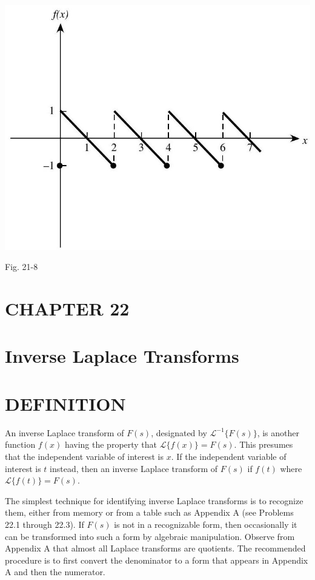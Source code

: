 \documentclass[10pt]{article}
\begin{document}
\begin{center}
\includegraphics[max width=\textwidth]{2024_04_03_5bb5b4275a64cb9887d1g-241(1)}
\end{center}

Fig. 21-8

\section*{CHAPTER 22}
\section*{Inverse Laplace Transforms}
\section*{DEFINITION}
An inverse Laplace transform of $F(s)$, designated by $\mathscr{L}^{-1}\{F(s)\}$, is another function $f(x)$ having the property that $\mathscr{L}\{f(x)\}=F(s)$. This presumes that the independent variable of interest is $x$. If the independent variable of interest is $t$ instead, then an inverse Laplace transform of $F(s)$ if $f(t)$ where $\mathscr{L}\{f(t)\}=F(s)$.

The simplest technique for identifying inverse Laplace transforms is to recognize them, either from memory or from a table such as Appendix A (see Problems 22.1 through 22.3). If $F(s)$ is not in a recognizable form, then occasionally it can be transformed into such a form by algebraic manipulation. Observe from Appendix A that almost all Laplace transforms are quotients. The recommended procedure is to first convert the denominator to a form that appears in Appendix A and then the numerator.
\end{document}
